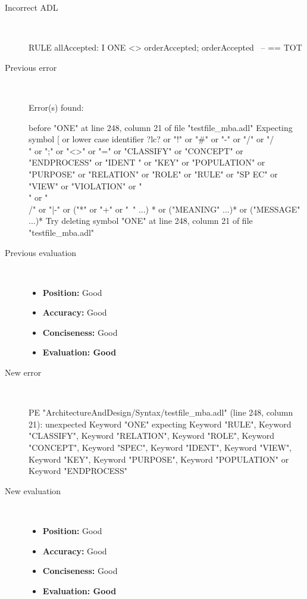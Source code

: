 \begin{description}
  \item[Incorrect ADL]~\\
\begin{adl}
RULE allAccepted: I ONE <> orderAccepted; orderAccepted~ -- == TOT\end{adl}
  \item[Previous error]~\\
\begin{haskell}
Error(s) found:

before "ONE" at line 248, column 21 of file "testfile_mba.adl"
Expecting symbol [ or lower case identifier ?lc? or "!" or "#" or "-" or "/" or
"/\\" or ";" or "<>" or "=" or "CLASSIFY" or "CONCEPT" or "ENDPROCESS" or "IDENT
" or "KEY" or "POPULATION" or "PURPOSE" or "RELATION" or "ROLE" or "RULE" or "SP
EC" or "VIEW" or "VIOLATION" or "\\" or "\\/" or "|-" or ("*" or "+" or "~" ...)
* or ("MEANING" ...)* or ("MESSAGE" ...)*
Try deleting symbol "ONE" at line 248, column 21 of file "testfile_mba.adl"

\end{haskell}
  \item[Previous evaluation]~\\
    \begin{itemize}
    \item \textbf{Position:} Good
    \item \textbf{Accuracy:} Good
    \item \textbf{Conciseness:} Good
    \item \textbf{Evaluation: Good}
    \end{itemize}
  \item[New error]~\\
\begin{haskell}
PE "ArchitectureAndDesign/Syntax/testfile_mba.adl" (line 248, column 21):
unexpected Keyword "ONE"
expecting Keyword "RULE", Keyword "CLASSIFY", Keyword "RELATION", Keyword "ROLE", Keyword "CONCEPT", Keyword "SPEC", Keyword "IDENT", Keyword "VIEW", Keyword "KEY", Keyword "PURPOSE", Keyword "POPULATION" or Keyword "ENDPROCESS"
\end{haskell}
  \item[New evaluation]~\\
    \begin{itemize}
    \item \textbf{Position:} Good
    \item \textbf{Accuracy:} Good
    \item \textbf{Conciseness:} Good
    \item \textbf{Evaluation: Good}
    \end{itemize}
  \end{description}

